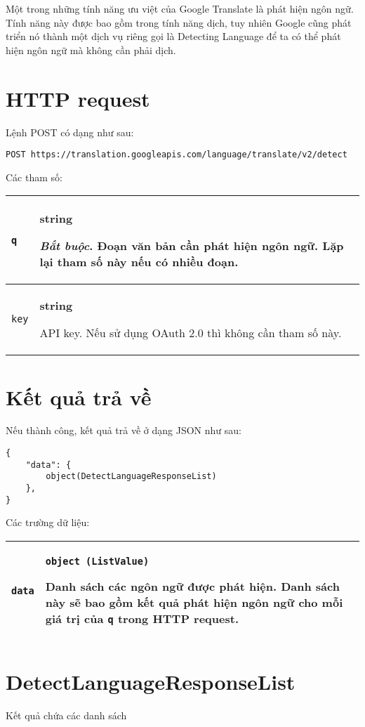 \documentclass[../thesis.tex]{subfiles}
\begin{document}
Một trong những tính năng ưu việt của Google Translate là phát hiện ngôn ngữ. Tính năng này được bao gồm trong tính năng dịch, tuy nhiên Google cũng phát triển nó thành một dịch vụ riêng gọi là Detecting Language để ta có thể phát hiện ngôn ngữ mà không cần phải dịch.

\section{HTTP request}
Lệnh POST có dạng như sau:
\begin{lstlisting}[numbers=none, frame=single,xleftmargin=0.15cm,xrightmargin=0.15cm]
POST https://translation.googleapis.com/language/translate/v2/detect
\end{lstlisting}

Các tham số:

\begin{center}
\begin{tabularx}{\textwidth}{|p{}|X|}
\hline
\lstinline{q} & \textbf{string}

\textit{Bắt buộc}. Đoạn văn bản cần phát hiện ngôn ngữ. Lặp lại tham số này nếu có nhiều đoạn.\\
\hline
\lstinline{key} & \textbf{string}

API key. Nếu sử dụng OAuth 2.0 thì không cần tham số này.\\
\hline
\end{tabularx}
\end{center}

\section{Kết quả trả về}
Nếu thành công, kết quả trả về ở dạng JSON như sau:
\begin{lstlisting}[numbers=none, frame=single,xleftmargin=0.15cm,xrightmargin=0.15cm]
{
	"data": {
		object(DetectLanguageResponseList)
	},
}
\end{lstlisting}

Các trường dữ liệu:
\begin{center}
\begin{tabularx}{\textwidth}{|p{}|X|}
\hline
\lstinline{data} & \lstinline{object (ListValue)}

Danh sách các ngôn ngữ được phát hiện. Danh sách này sẽ bao gồm kết quả phát hiện ngôn ngữ cho mỗi giá trị của \lstinline{q} trong HTTP request.\\
\hline
\end{tabularx}
\end{center}

\section{DetectLanguageResponseList}
Kết quả chứa các danh sách 
\end{document}
